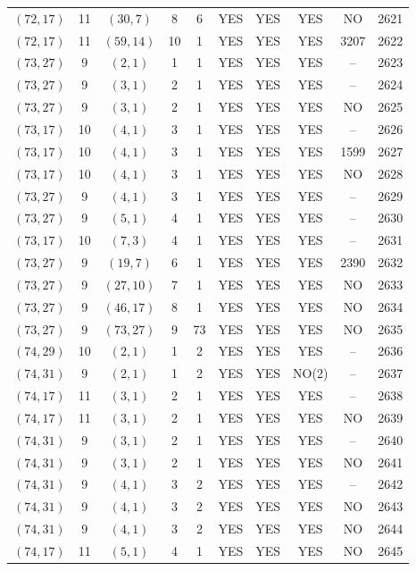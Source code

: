 \begin{longtable}{|c|c|c|c|c|c|c|c|c|c|}
$(72, 17)$ & 11 & $(30, 7)$ & 8 & 6 & YES & YES & YES & NO & 2621\\
$(72, 17)$ & 11 & $(59, 14)$ & 10 & 1 & YES & YES & YES & 3207 & 2622\\
$(73, 27)$ & 9 & $(2, 1)$ & 1 & 1 & YES & YES & YES & -- & 2623\\
$(73, 27)$ & 9 & $(3, 1)$ & 2 & 1 & YES & YES & YES & -- & 2624\\
$(73, 27)$ & 9 & $(3, 1)$ & 2 & 1 & YES & YES & YES & NO & 2625\\
$(73, 17)$ & 10 & $(4, 1)$ & 3 & 1 & YES & YES & YES & -- & 2626\\
$(73, 17)$ & 10 & $(4, 1)$ & 3 & 1 & YES & YES & YES & 1599 & 2627\\
$(73, 17)$ & 10 & $(4, 1)$ & 3 & 1 & YES & YES & YES & NO & 2628\\
$(73, 27)$ & 9 & $(4, 1)$ & 3 & 1 & YES & YES & YES & -- & 2629\\
$(73, 27)$ & 9 & $(5, 1)$ & 4 & 1 & YES & YES & YES & -- & 2630\\
$(73, 17)$ & 10 & $(7, 3)$ & 4 & 1 & YES & YES & YES & -- & 2631\\
$(73, 27)$ & 9 & $(19, 7)$ & 6 & 1 & YES & YES & YES & 2390 & 2632\\
$(73, 27)$ & 9 & $(27, 10)$ & 7 & 1 & YES & YES & YES & NO & 2633\\
$(73, 27)$ & 9 & $(46, 17)$ & 8 & 1 & YES & YES & YES & NO & 2634\\
$(73, 27)$ & 9 & $(73, 27)$ & 9 & 73 & YES & YES & YES & NO & 2635\\
$(74, 29)$ & 10 & $(2, 1)$ & 1 & 2 & YES & YES & YES & -- & 2636\\
$(74, 31)$ & 9 & $(2, 1)$ & 1 & 2 & YES & YES & NO(2) & -- & 2637\\
$(74, 17)$ & 11 & $(3, 1)$ & 2 & 1 & YES & YES & YES & -- & 2638\\
$(74, 17)$ & 11 & $(3, 1)$ & 2 & 1 & YES & YES & YES & NO & 2639\\
$(74, 31)$ & 9 & $(3, 1)$ & 2 & 1 & YES & YES & YES & -- & 2640\\
$(74, 31)$ & 9 & $(3, 1)$ & 2 & 1 & YES & YES & YES & NO & 2641\\
$(74, 31)$ & 9 & $(4, 1)$ & 3 & 2 & YES & YES & YES & -- & 2642\\
$(74, 31)$ & 9 & $(4, 1)$ & 3 & 2 & YES & YES & YES & NO & 2643\\
$(74, 31)$ & 9 & $(4, 1)$ & 3 & 2 & YES & YES & YES & NO & 2644\\
$(74, 17)$ & 11 & $(5, 1)$ & 4 & 1 & YES & YES & YES & NO & 2645\\

\end{longtable}
